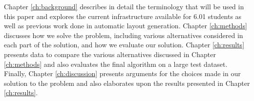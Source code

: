 Chapter \ref{ch:background} describes in detail the terminology that will be
used in this paper and explores the current infrastructure available for
6.01 students as well as previous work done in automatic layout generation.
Chapter \ref{ch:methods} discusses how we solve the problem, including various
alternatives considered in each part of the solution, and how we evaluate
our solution. Chapter \ref{ch:results} presents data to compare the various
alternatives discussed in Chapter \ref{ch:methods} and also evaluates the final
algorithm on a large test dataset. Finally, Chapter \ref{ch:discussion}
presents arguments for the choices made in our solution to the problem and
also elaborates upon the results presented in Chapter \ref{ch:results}.

%

